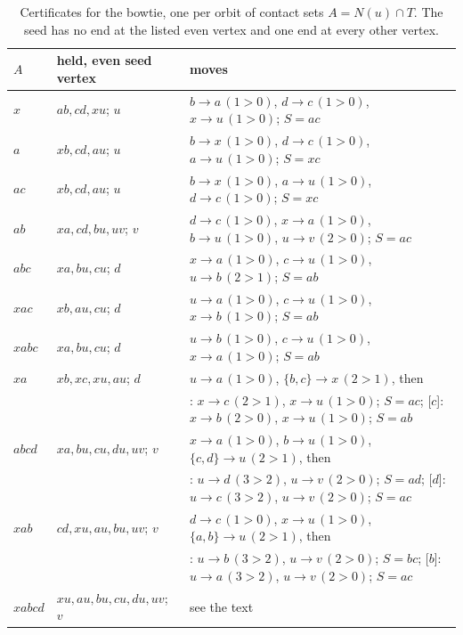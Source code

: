 \documentclass[11pt]{amsart}
\theoremstyle{definition}
\newcommand{\tr}{\to}
\begin{document}
\begin{table}[ht]
\centering\footnotesize
\setlength{\tabcolsep}{4pt}
\begin{tabular}{llp{9.3cm}}
\toprule
$A$ & held, even seed vertex & moves \\
\midrule
$x$ & $ab,cd,xu$; $u$ & $b\tr a\,(1{>}0)$, $d\tr c\,(1{>}0)$, $x\tr u\,(1{>}0)$; $S=ac$\\
$a$ & $xb,cd,au$; $u$ & $b\tr x\,(1{>}0)$, $d\tr c\,(1{>}0)$, $a\tr u\,(1{>}0)$; $S=xc$\\
$ac$ & $xb,cd,au$; $u$ & $b\tr x\,(1{>}0)$, $a\tr u\,(1{>}0)$, $d\tr c\,(1{>}0)$; $S=xc$\\
$ab$ & $xa,cd,bu,uv$; $v$ & $d\tr c\,(1{>}0)$, $x\tr a\,(1{>}0)$, $b\tr u\,(1{>}0)$, $u\tr v\,(2{>}0)$; $S=ac$\\
$abc$ & $xa,bu,cu$; $d$ & $x\tr a\,(1{>}0)$, $c\tr u\,(1{>}0)$, $u\tr b\,(2{>}1)$; $S=ab$\\
$xac$ & $xb,au,cu$; $d$ & $u\tr a\,(1{>}0)$, $c\tr u\,(1{>}0)$, $x\tr b\,(1{>}0)$; $S=ab$\\
$xabc$ & $xa,bu,cu$; $d$ & $u\tr b\,(1{>}0)$, $c\tr u\,(1{>}0)$, $x\tr a\,(1{>}0)$; $S=ab$\\
$xa$ & $xb,xc,xu,au$; $d$ & $u\tr a\,(1{>}0)$, $\{b,c\}\tr x\,(2{>}1)$, then\\
& & \quad[$b$]: $x\tr c\,(2{>}1)$, $x\tr u\,(1{>}0)$; $S=ac$;
[$c$]: $x\tr b\,(2{>}0)$, $x\tr u\,(1{>}0)$; $S=ab$\\
$abcd$ & $xa,bu,cu,du,uv$; $v$ & $x\tr a\,(1{>}0)$, $b\tr u\,(1{>}0)$, $\{c,d\}\tr u\,(2{>}1)$, then\\
& & \quad[$c$]: $u\tr d\,(3{>}2)$, $u\tr v\,(2{>}0)$; $S=ad$;
[$d$]: $u\tr c\,(3{>}2)$, $u\tr v\,(2{>}0)$; $S=ac$\\
$xab$ & $cd,xu,au,bu,uv$; $v$ & $d\tr c\,(1{>}0)$, $x\tr u\,(1{>}0)$, $\{a,b\}\tr u\,(2{>}1)$, then\\
& & \quad[$a$]: $u\tr b\,(3{>}2)$, $u\tr v\,(2{>}0)$; $S=bc$;
[$b$]: $u\tr a\,(3{>}2)$, $u\tr v\,(2{>}0)$; $S=ac$\\
$xabcd$ & $xu,au,bu,cu,du,uv$; $v$ & see the text\\
\bottomrule
\end{tabular}
\caption{Certificates for the bowtie, one per orbit of contact sets $A=N(u)\cap T$. The seed has no
end at the listed even vertex and one end at every other vertex.}\label{tab:bowtie}
\end{table}
\end{document}
